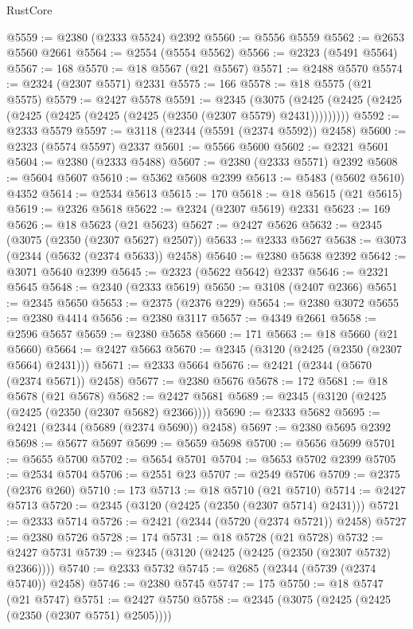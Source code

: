 \begin{lexlean}{RustCore}
\begin{coremodule}
@5559 := @2380 (@2333 @5524) @2392
@5560 := @5556 @5559
@5562 := @2653 @5560 @2661
@5564 := @2554 (@5554 @5562)
@5566 := @2323 (@5491 @5564)
@5567 := 168
@5570 := @18 @5567 (@21 @5567)
@5571 := @2488 @5570
@5574 := @2324 (@2307 @5571) @2331
@5575 := 166
@5578 := @18 @5575 (@21 @5575)
@5579 := @2427 @5578
@5591 := @2345
    (@3075 (@2425 (@2425 (@2425 (@2425 (@2425 (@2425 (@2425 (@2350 (@2307 @5579) @2431)))))))))
@5592 := @2333 @5579
@5597 := @3118 (@2344 (@5591 (@2374 @5592)) @2458)
@5600 := @2323 (@5574 @5597) @2337
@5601 := @5566 @5600
@5602 := @2321 @5601
@5604 := @2380 (@2333 @5488)
@5607 := @2380 (@2333 @5571) @2392
@5608 := @5604 @5607
@5610 := @5362 @5608 @2399
@5613 := @5483 (@5602 @5610) @4352
@5614 := @2534 @5613
@5615 := 170
@5618 := @18 @5615 (@21 @5615)
@5619 := @2326 @5618
@5622 := @2324 (@2307 @5619) @2331
@5623 := 169
@5626 := @18 @5623 (@21 @5623)
@5627 := @2427 @5626
@5632 := @2345 (@3075 (@2350 (@2307 @5627) @2507))
@5633 := @2333 @5627
@5638 := @3073 (@2344 (@5632 (@2374 @5633)) @2458)
@5640 := @2380 @5638 @2392
@5642 := @3071 @5640 @2399
@5645 := @2323 (@5622 @5642) @2337
@5646 := @2321 @5645
@5648 := @2340 (@2333 @5619)
@5650 := @3108 (@2407 @2366)
@5651 := @2345 @5650
@5653 := @2375 (@2376 @229)
@5654 := @2380 @3072
@5655 := @2380 @4414
@5656 := @2380 @3117
@5657 := @4349 @2661
@5658 := @2596 @5657
@5659 := @2380 @5658
@5660 := 171
@5663 := @18 @5660 (@21 @5660)
@5664 := @2427 @5663
@5670 := @2345 (@3120 (@2425 (@2350 (@2307 @5664) @2431)))
@5671 := @2333 @5664
@5676 := @2421 (@2344 (@5670 (@2374 @5671)) @2458)
@5677 := @2380 @5676
@5678 := 172
@5681 := @18 @5678 (@21 @5678)
@5682 := @2427 @5681
@5689 := @2345 (@3120 (@2425 (@2425 (@2350 (@2307 @5682) @2366))))
@5690 := @2333 @5682
@5695 := @2421 (@2344 (@5689 (@2374 @5690)) @2458)
@5697 := @2380 @5695 @2392
@5698 := @5677 @5697
@5699 := @5659 @5698
@5700 := @5656 @5699
@5701 := @5655 @5700
@5702 := @5654 @5701
@5704 := @5653 @5702 @2399
@5705 := @2534 @5704
@5706 := @2551 @23
@5707 := @2549 @5706
@5709 := @2375 (@2376 @260)
@5710 := 173
@5713 := @18 @5710 (@21 @5710)
@5714 := @2427 @5713
@5720 := @2345 (@3120 (@2425 (@2350 (@2307 @5714) @2431)))
@5721 := @2333 @5714
@5726 := @2421 (@2344 (@5720 (@2374 @5721)) @2458)
@5727 := @2380 @5726
@5728 := 174
@5731 := @18 @5728 (@21 @5728)
@5732 := @2427 @5731
@5739 := @2345 (@3120 (@2425 (@2425 (@2350 (@2307 @5732) @2366))))
@5740 := @2333 @5732
@5745 := @2685 (@2344 (@5739 (@2374 @5740)) @2458)
@5746 := @2380 @5745
@5747 := 175
@5750 := @18 @5747 (@21 @5747)
@5751 := @2427 @5750
@5758 := @2345 (@3075 (@2425 (@2425 (@2350 (@2307 @5751) @2505))))

\end{coremodule}
\end{lexlean}
